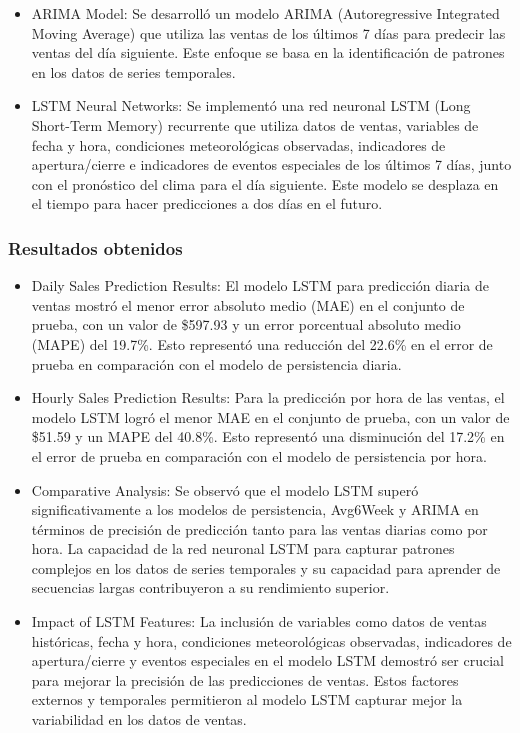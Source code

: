 \begin{itemize}
	\item ARIMA Model:
	Se desarrolló un modelo ARIMA (Autoregressive Integrated Moving Average) que utiliza las ventas de los últimos 7 días para predecir las ventas del día siguiente. Este enfoque se basa en la identificación de patrones en los datos de series temporales.
	
	\item LSTM Neural Networks:
	Se implementó una red neuronal LSTM (Long Short-Term Memory) recurrente que utiliza datos de ventas, variables de fecha y hora, condiciones meteorológicas observadas, indicadores de apertura/cierre e indicadores de eventos especiales de los últimos 7 días, junto con el pronóstico del clima para el día siguiente. Este modelo se desplaza en el tiempo para hacer predicciones a dos días en el futuro.
	
	
\end{itemize}

\subsubsection{Resultados obtenidos}

\begin{itemize}
	\item Daily Sales Prediction Results:
	El modelo LSTM para predicción diaria de ventas mostró el menor error absoluto medio (MAE) en el conjunto de prueba, con un valor de \$597.93 y un error porcentual absoluto medio (MAPE) del 19.7\%. Esto representó una reducción del 22.6\% en el error de prueba en comparación con el modelo de persistencia diaria.
	
	\item Hourly Sales Prediction Results:
	Para la predicción por hora de las ventas, el modelo LSTM logró el menor MAE en el conjunto de prueba, con un valor de \$51.59 y un MAPE del 40.8\%. Esto representó una disminución del 17.2\% en el error de prueba en comparación con el modelo de persistencia por hora.
	
	\item Comparative Analysis:
	Se observó que el modelo LSTM superó significativamente a los modelos de persistencia, Avg6Week y ARIMA en términos de precisión de predicción tanto para las ventas diarias como por hora. La capacidad de la red neuronal LSTM para capturar patrones complejos en los datos de series temporales y su capacidad para aprender de secuencias largas contribuyeron a su rendimiento superior.
	
	\item Impact of LSTM Features:
	La inclusión de variables como datos de ventas históricas, fecha y hora, condiciones meteorológicas observadas, indicadores de apertura/cierre y eventos especiales en el modelo LSTM demostró ser crucial para mejorar la precisión de las predicciones de ventas. Estos factores externos y temporales permitieron al modelo LSTM capturar mejor la variabilidad en los datos de ventas.
	
\end{itemize}

